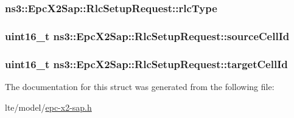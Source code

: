 \subsubsection[{\texorpdfstring{rlc\+Type}{rlcType}}]{ ns3\+::\+Epc\+X2\+Sap\+::\+Rlc\+Setup\+Request\+::rlc\+Type}\hypertarget{structns3_1_1EpcX2Sap_1_1RlcSetupRequest_a5fbe483f8f9a06b437b0747e04f12978}{}\label{structns3_1_1EpcX2Sap_1_1RlcSetupRequest_a5fbe483f8f9a06b437b0747e04f12978}
\subsubsection[{\texorpdfstring{source\+Cell\+Id}{sourceCellId}}]{\setlength{\rightskip}{0pt plus 5cm}uint16\+\_\+t ns3\+::\+Epc\+X2\+Sap\+::\+Rlc\+Setup\+Request\+::source\+Cell\+Id}\hypertarget{structns3_1_1EpcX2Sap_1_1RlcSetupRequest_afce35d71ef2c18fc97fa489967dbf610}{}\label{structns3_1_1EpcX2Sap_1_1RlcSetupRequest_afce35d71ef2c18fc97fa489967dbf610}
\subsubsection[{\texorpdfstring{target\+Cell\+Id}{targetCellId}}]{\setlength{\rightskip}{0pt plus 5cm}uint16\+\_\+t ns3\+::\+Epc\+X2\+Sap\+::\+Rlc\+Setup\+Request\+::target\+Cell\+Id}\hypertarget{structns3_1_1EpcX2Sap_1_1RlcSetupRequest_acf02682651bbf7a82e792e489e58f5b4}{}\label{structns3_1_1EpcX2Sap_1_1RlcSetupRequest_acf02682651bbf7a82e792e489e58f5b4}


The documentation for this struct was generated from the following file\+:\begin{DoxyCompactItemize}
\item 
lte/model/\hyperlink{epc-x2-sap_8h}{epc-\/x2-\/sap.\+h}\end{DoxyCompactItemize}
